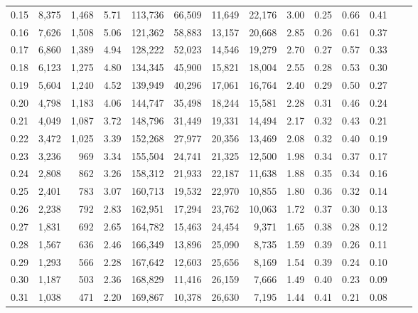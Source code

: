 \begin{tabular}{rrrrrrrrrrrrrr}
0.15 &   8,375 &  1,468 &    5.71 &  113,736 &   66,509 &  11,649 &  22,176 &  3.00 &  0.25 &  0.66 &      0.41 \\
0.16 &   7,626 &  1,508 &    5.06 &  121,362 &   58,883 &  13,157 &  20,668 &  2.85 &  0.26 &  0.61 &      0.37 \\
0.17 &   6,860 &  1,389 &    4.94 &  128,222 &   52,023 &  14,546 &  19,279 &  2.70 &  0.27 &  0.57 &      0.33 \\
0.18 &   6,123 &  1,275 &    4.80 &  134,345 &   45,900 &  15,821 &  18,004 &  2.55 &  0.28 &  0.53 &      0.30 \\
0.19 &   5,604 &  1,240 &    4.52 &  139,949 &   40,296 &  17,061 &  16,764 &  2.40 &  0.29 &  0.50 &      0.27 \\
0.20 &   4,798 &  1,183 &    4.06 &  144,747 &   35,498 &  18,244 &  15,581 &  2.28 &  0.31 &  0.46 &      0.24 \\
0.21 &   4,049 &  1,087 &    3.72 &  148,796 &   31,449 &  19,331 &  14,494 &  2.17 &  0.32 &  0.43 &      0.21 \\
0.22 &   3,472 &  1,025 &    3.39 &  152,268 &   27,977 &  20,356 &  13,469 &  2.08 &  0.32 &  0.40 &      0.19 \\
0.23 &   3,236 &    969 &    3.34 &  155,504 &   24,741 &  21,325 &  12,500 &  1.98 &  0.34 &  0.37 &      0.17 \\
0.24 &   2,808 &    862 &    3.26 &  158,312 &   21,933 &  22,187 &  11,638 &  1.88 &  0.35 &  0.34 &      0.16 \\
0.25 &   2,401 &    783 &    3.07 &  160,713 &   19,532 &  22,970 &  10,855 &  1.80 &  0.36 &  0.32 &      0.14 \\
0.26 &   2,238 &    792 &    2.83 &  162,951 &   17,294 &  23,762 &  10,063 &  1.72 &  0.37 &  0.30 &      0.13 \\
0.27 &   1,831 &    692 &    2.65 &  164,782 &   15,463 &  24,454 &   9,371 &  1.65 &  0.38 &  0.28 &      0.12 \\
0.28 &   1,567 &    636 &    2.46 &  166,349 &   13,896 &  25,090 &   8,735 &  1.59 &  0.39 &  0.26 &      0.11 \\
0.29 &   1,293 &    566 &    2.28 &  167,642 &   12,603 &  25,656 &   8,169 &  1.54 &  0.39 &  0.24 &      0.10 \\
0.30 &   1,187 &    503 &    2.36 &  168,829 &   11,416 &  26,159 &   7,666 &  1.49 &  0.40 &  0.23 &      0.09 \\
0.31 &   1,038 &    471 &    2.20 &  169,867 &   10,378 &  26,630 &   7,195 &  1.44 &  0.41 &  0.21 &      0.08 \\

\end{tabular}

